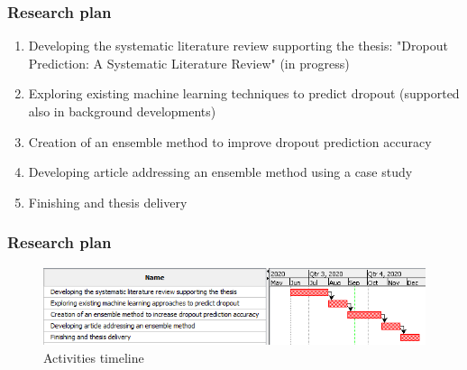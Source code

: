 \documentclass[10pt]{beamer}
\begin{document}

\begin{frame}
	\frametitle{Research plan}
	\begin{enumerate}
		\item Developing the systematic literature review supporting the thesis: "Dropout Prediction: A Systematic Literature Review" (in progress)
		\item Exploring existing machine learning techniques to predict dropout (supported also in background developments)
		\item Creation of an ensemble method to improve dropout prediction accuracy
		\item Developing article addressing an ensemble method using a case study
		\item Finishing and thesis delivery
	\end{enumerate}
\end{frame}

\begin{frame}
	\frametitle{Research plan}
	\begin{figure}
		\includegraphics[scale=0.65]{../img/chronogram.png}
		\caption{Activities timeline}
		\label{figure1}
	\end{figure}
\end{frame}
\end{document}
